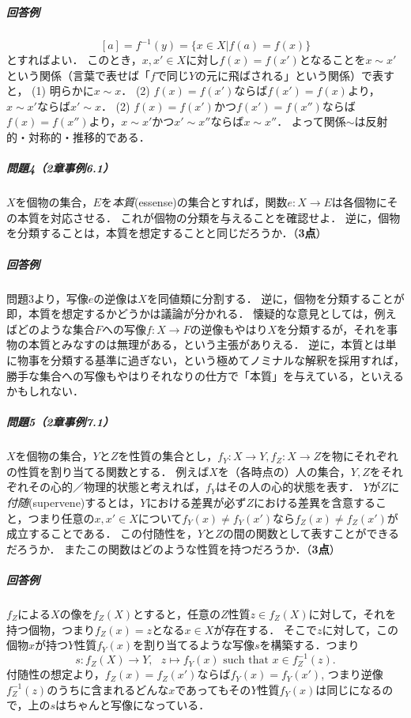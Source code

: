 \documentclass[11pt,a4paper]{jsarticle}
\begin{document}
\subparagraph{回答例}
\[
 [a] = f^{-1}(y) = \{x \in X | f(a) = f(x) \}
\]
とすればよい．
このとき，$x, x' \in X$に対し$f(x) = f(x')$となることを$x \sim x'$という関係（言葉で表せば「$f$で同じ$Y$の元に飛ばされる」という関係）で表すと，
(1) 明らかに$x \sim x$．
(2) $f(x) = f(x')$ならば$f(x') = f(x)$より，$x \sim x'$ならば$x' \sim x$．
(2) $f(x) = f(x')$かつ$f(x') = f(x'')$ならば$f(x) = f(x'')$より，$x \sim x'$かつ$x' \sim x''$ならば$x \sim x''$．
よって関係$\sim$は反射的・対称的・推移的である．



\subparagraph{問題4（2章事例6.1）}
$X$を個物の集合，$E$を\emph{本質}(essense)の集合とすれば，関数$e:X \to E$は各個物にその本質を対応させる．
これが個物の分類を与えることを確認せよ．
逆に，個物を分類することは，本質を想定することと同じだろうか．（\textbf{3点}）

\subparagraph{回答例}
問題3より，写像$e$の逆像は$X$を同値類に分割する．
逆に，個物を分類することが即，本質を想定するかどうかは議論が分かれる．
懐疑的な意見としては，例えばどのような集合$F$への写像$f:X \to F$の逆像もやはり$X$を分類するが，それを事物の本質とみなすのは無理がある，という主張がありえる．
逆に，本質とは単に物事を分類する基準に過ぎない，という極めてノミナルな解釈を採用すれば，勝手な集合への写像もやはりそれなりの仕方で「本質」を与えている，といえるかもしれない．



\subparagraph{問題5（2章事例7.1）}
 $X$を個物の集合，$Y$と$Z$を性質の集合とし，$f_Y:X \to Y, f_Z:X \to Z$を物にそれぞれの性質を割り当てる関数とする．
例えば$X$を（各時点の）人の集合，$Y, Z$をそれぞれその心的／物理的状態と考えれば，$f_Y$はその人の心的状態を表す．
$Y$が$Z$に\emph{付随}(supervene)するとは，$Y$における差異が必ず$Z$における差異を含意すること，つまり任意の$x, x' \in X$について$f_Y(x) \neq f_Y(x')$なら$f_Z(x) \neq f_Z(x')$が成立することである．
この付随性を，$Y$と$Z$の間の関数として表すことができるだろうか．
またこの関数はどのような性質を持つだろうか．（\textbf{3点}）


\subparagraph{回答例}
$f_Z$による$X$の像を$f_Z(X)$とすると，任意の$Z$性質$z \in f_Z(X)$に対して，それを持つ個物，つまり$f_Z(x)=z$となる$x \in X$が存在する．
そこで$z$に対して，この個物$x$が持つ$Y$性質$f_Y(x)$を割り当てるような写像$s$を構築する．つまり
\[ s: f_Z(X) \to Y, \ \ \ z \mapsto f_Y(x) \text{ such that } x \in f_Z^{-1}(z). \]
付随性の想定より，$f_Z(x) = f_Z(x')$ならば$f_Y(x) = f_Y(x')$, つまり逆像$f_Z^{-1}(z)$のうちに含まれるどんな$x$であってもその$Y$性質$f_Y(x)$は同じになるので，上の$s$はちゃんと写像になっている．
\end{document}
